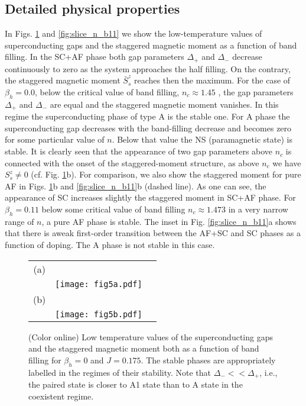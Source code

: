 \documentclass[aps,prb,showpacs,reprint]{revtex4-1}
\begin{document}
\subsection{Detailed physical properties}

In Figs. \ref{fig:slice_n_b0} and
\ref{fig:slice_n_b11} we show the low-temperature values of superconducting gaps
and the staggered magnetic moment as a function of band filling. In the SC+AF
phase both gap parameters $\Delta_+$ and $\Delta_-$ decrease continuously to
zero as
the system approaches the half filling. On the contrary, the staggered
magnetic
moment $\bar{S}^z_s$ reaches then the maximum. For the case of $\beta_h=0.0$,
below
the critical value of band filling, $n_c\approx 1.45$ , the gap parameters
$\Delta_{+}$ and $\Delta_{-}$ are equal and the staggered magnetic moment
vanishes. In this regime the superconducting phase of type A is the stable one.
For A phase the superconducting gap decreases with the band-filling
decrease and becomes zero for some particular value of $n$. Below that
value the NS (paramagnetic state) is stable. It is clearly seen that the
appearance of two gap parameters above
$n_c$ is
connected with the onset of the staggered-moment structure, as above $n_c$
we have $S_s^z\neq 0$ (cf. Fig. \ref{fig:slice_n_b0}b). For comparison, we also
show the
staggered moment for pure AF in Figs. \ref{fig:slice_n_b0}b and
\ref{fig:slice_n_b11}b (dashed line). As one can see, the appearance of SC
increases
slightly the
staggered moment in SC+AF phase.  
For $\beta_h=0.11$ below some critical value of band filling $n_c\approx 1.473$
in a very narrow range of $n$, a pure AF phase is stable. The inset in Fig.
\ref{fig:slice_n_b11}a shows that there is aweak first-order transition between the
AF+SC and SC phases as a function of doping. The A phase is not stable in this
case.

\begin{figure}[htpb]
\centering
\begin{tabular}{ccc}
  (a) & & \quad \quad \quad \quad \quad\\
      & \texttt{[image: fig5a.pdf]} & \\
  (b) & & \quad \quad \quad \quad \quad\\
      & \texttt{[image: fig5b.pdf]} &\\
\end{tabular}
\caption{(Color online) Low temperature values of the superconducting gaps
and the staggered
magnetic moment both as a function of band filling for $\beta_h=0$ and
$J=0.175$. The stable
phases are appropriately labelled in the regimes of their stability. Note that
$\Delta_-<<\Delta_+$, i.e., the paired state is closer to A1 state than to A
state in the coexistent regime.}
\label{fig:slice_n_b0}
\end{figure}
\end{document}
